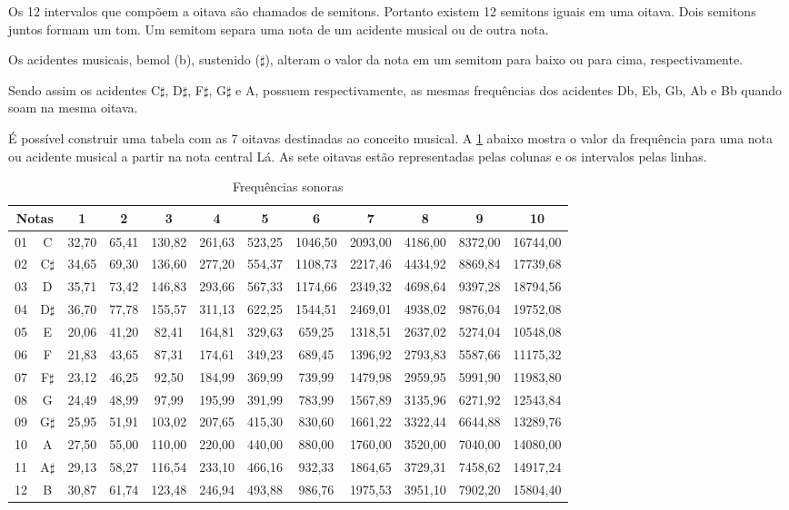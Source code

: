 Os 12 intervalos que compõem a oitava são chamados de semitons. Portanto
existem 12 semitons iguais em uma oitava. Dois semitons juntos formam um
tom. Um semitom separa uma nota de um acidente musical ou de outra nota.

Os acidentes musicais, bemol (b), sustenido ($\sharp$), alteram o valor da nota em um semitom para baixo ou para cima, respectivamente.

Sendo assim os acidentes C$\sharp$, D$\sharp$, F$\sharp$, G$\sharp$ e A, possuem respectivamente, as mesmas frequências dos acidentes Db, Eb, Gb, Ab e Bb quando soam na mesma oitava.

É possível construir uma tabela com as 7 oitavas destinadas ao conceito musical. A \cref{tabela} abaixo mostra o valor da frequência para uma nota ou acidente musical a partir na nota central Lá.
As sete oitavas estão representadas pelas colunas e os intervalos pelas linhas.

\begin{table}[!htb]
	\centering	
	\caption{Frequências sonoras}
	\label{tabela}
	\begin{tabular}	{|c|c|c|c|c|c|c|c|c|c|c|c|}
	\hline
	\multicolumn{2}{|c|}{Notas}  & 1 & 2 & 3 & 4 & 5 & 6 & 7 & 8 & 9 & 10  \\ \hline
		01 & C         & 32,70 & 65,41  & 130,82 & 261,63 & 523,25 & 1046,50 & 2093,00 & 4186,00 & 8372,00 & 16744,00 \\ \hline
		02 & C$\sharp$ & 34,65 & 69,30  & 136,60 & 277,20 & 554,37 & 1108,73 & 2217,46 & 4434,92 & 8869,84 & 17739,68 \\ \hline
		03 & D         & 35,71 & 73,42  & 146,83 & 293,66 & 567,33 & 1174,66 & 2349,32 & 4698,64 &  9397,28 & 18794,56 \\ \hline
		04 & D$\sharp$ & 36,70 & 77,78  & 155,57 & 311,13 & 622,25 & 1544,51 & 2469,01 & 4938,02 & 9876,04 & 19752,08 \\ \hline
		05 & E         & 20,06 & 41,20 & 82,41  & 164,81 & 329,63 & 659,25 & 1318,51 & 2637,02 & 5274,04 & 10548,08 \\ \hline
		06 & F         & 21,83 & 43,65 & 87,31  & 174,61 & 349,23 & 689,45 & 1396,92 & 2793,83 & 5587,66 & 11175,32 \\ \hline
		07 & F$\sharp$ & 23,12 & 46,25 & 92,50  & 184,99 & 369,99 & 739,99 & 1479,98 & 2959,95 & 5991,90 & 11983,80 \\ \hline
		08 & G         & 24,49 & 48,99 & 97,99  & 195,99 & 391,99 & 783,99 & 1567,89 & 3135,96 & 6271,92 & 12543,84 \\ \hline
		09 & G$\sharp$ & 25,95 & 51,91 & 103,02 & 207,65 & 415,30 & 830,60 & 1661,22 & 3322,44 & 6644,88 & 13289,76 \\ \hline
		10 & A         & 27,50 & 55,00 & 110,00 & 220,00 & 440,00 & 880,00 & 1760,00 & 3520,00 & 7040,00 & 14080,00 \\ \hline
		11 & A$\sharp$ & 29,13 & 58,27 & 116,54 & 233,10 & 466,16 & 932,33 & 1864,65 & 3729,31 & 7458,62 & 14917,24 \\ \hline
		12 & B         & 30,87 & 61,74 & 123,48 & 246,94 & 493,88 & 986,76 & 1975,53 & 3951,10 & 7902,20 & 15804,40 \\ \hline
	\end{tabular}
\end{table}

